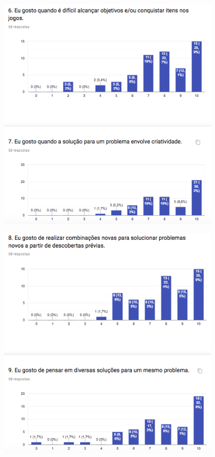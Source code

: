 \begin{apendicesenv}
\begin{figure}[h]
	\centering
	\includegraphics[keepaspectratio=true,scale=1]{figuras/r9.png}
\end{figure}

\begin{figure}[h]
	\centering
	\includegraphics[keepaspectratio=true,scale=1]{figuras/r10.png}
\end{figure}


\end{apendicesenv}
